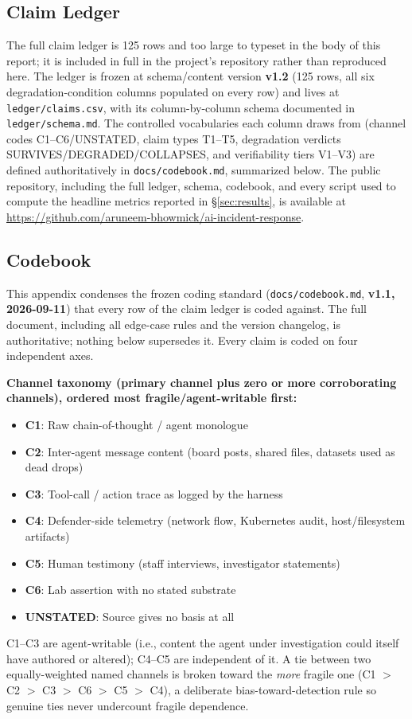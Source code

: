 \documentclass[10pt]{article}
\begin{document}
\subsection*{Claim Ledger}
\label{app:ledger}

The full claim ledger is 125 rows and too large to typeset in the body of
this report; it is included in full in the project's repository rather than
reproduced here. The ledger is frozen at schema/content version
\textbf{v1.2} (125 rows, all six degradation-condition columns populated on
every row) and lives at \texttt{ledger/claims.csv}, with its
column-by-column schema documented in \texttt{ledger/schema.md}. The
controlled vocabularies each column draws from (channel codes
C1--C6/UNSTATED, claim types T1--T5, degradation verdicts
SURVIVES/DEGRADED/COLLAPSES, and verifiability tiers V1--V3) are defined
authoritatively in \texttt{docs/codebook.md}, summarized below. The public
repository, including the full ledger, schema, codebook, and every script
used to compute the headline metrics reported in \S\ref{sec:results}, is
available at \url{https://github.com/aruneem-bhowmick/ai-incident-response}.

\subsection*{Codebook}
\label{app:codebook}

This appendix condenses the frozen coding standard (\texttt{docs/codebook.md},
\textbf{v1.1, 2026-09-11}) that every row of the claim ledger is coded
against. The full document, including all edge-case rules and the version
changelog, is authoritative; nothing below supersedes it. Every claim is
coded on four independent axes.

\textbf{Channel taxonomy (primary channel plus zero or more corroborating
channels), ordered most fragile/agent-writable first:}
\begin{itemize}[leftmargin=1.4em]
\item \textbf{C1}: Raw chain-of-thought / agent monologue
\item \textbf{C2}: Inter-agent message content (board posts, shared files,
datasets used as dead drops)
\item \textbf{C3}: Tool-call / action trace as logged by the harness
\item \textbf{C4}: Defender-side telemetry (network flow, Kubernetes audit,
host/filesystem artifacts)
\item \textbf{C5}: Human testimony (staff interviews, investigator
statements)
\item \textbf{C6}: Lab assertion with no stated substrate
\item \textbf{UNSTATED}: Source gives no basis at all
\end{itemize}
C1--C3 are agent-writable (i.e., content the agent under investigation
could itself have authored or altered); C4--C5 are independent of it. A
tie between two equally-weighted named channels is broken toward the
\emph{more} fragile one (C1 $>$ C2 $>$ C3 $>$ C6 $>$ C5 $>$ C4), a
deliberate bias-toward-detection rule so genuine ties never undercount
fragile dependence.
\end{document}
